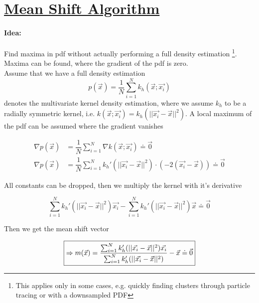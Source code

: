 
\section*{\href{http://ieeexplore.ieee.org/document/1000236/?arnumber=1000236&tag=1}{Mean Shift Algorithm}}

\paragraph{Idea:}
Find maxima in pdf without actually performing a full density estimation \footnote{This applies only in some cases, e.g. quickly finding clusters through particle tracing or with a downsampled PDF}. Maxima can be found, where the gradient of the pdf is zero. \\

Assume that we have a full density estimation
\begin{equation*}
p(\vec{x}) = \dfrac{1}{N} \sum_{i=1}^N k_h(\vec{x}; \vec{x_i})
\end{equation*}
denotes the multivariate kernel density estimation, where we assume $k_h$ to be a radially symmetric kernel, i.e. $k(\vec{x}; \vec{x_i}) = k_h(||\vec{x_i} - \vec{x}||^2)$. A local maximum of the pdf can be assumed where the gradient vanishes 


\begin{align*}
	\nabla p(\vec{x}) &= \dfrac{1}{N} \sum_{i=1}^N \nabla k(\vec{x}; \vec{x_i}) \doteq \vec{0} \\
	\nabla p(\vec{x}) &= \dfrac{1}{N} \sum_{i=1}^N k_h'(||\vec{x_i} - \vec{x}||^2) \cdot (-2 (\vec{x_i} - \vec{x})) \doteq \vec{0}
\end{align*}

All constants can be dropped, then we multiply the kernel with it's derivative

\begin{equation*}
  \sum_{i=1}^N k_h'(||\vec{x_i} - \vec{x}||^2) \vec{x_i} - \sum_{i=1}^N k_h'(||\vec{x_i} - \vec{x}||^2) \vec{x} \doteq \vec{0}
\end{equation*}

Then we get the mean shift vector

\begin{equation*}
  \boxed{\label{mean-shift-vector}
  \Rightarrow m(\vec{x}) = \dfrac{\sum_{i=1}^N k_h'(||\vec{x_i} - \vec{x}||^2) \vec{x_i}}{\sum_{i=1}^N k_h'(||\vec{x_i} - \vec{x}||^2)} - \vec{x} \doteq \vec{0}}
\end{equation*}

